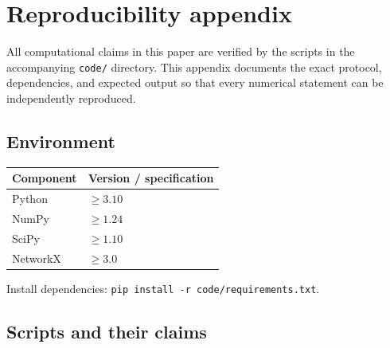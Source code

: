 \documentclass[11pt,a4paper]{amsart}
\theoremstyle{plain}
\theoremstyle{definition}
\theoremstyle{remark}
\begin{document}



\appendix
\section{Reproducibility appendix}\label{app:repro}

All computational claims in this paper are verified by the scripts in the
accompanying \texttt{code/} directory.  This appendix documents the exact
protocol, dependencies, and expected output so that every numerical statement
can be independently reproduced.

\subsection{Environment}

\begin{tabular}{@{}ll@{}}
\toprule
\textbf{Component} & \textbf{Version / specification} \\
\midrule
Python      & $\geq 3.10$ \\
NumPy       & $\geq 1.24$ \\
SciPy       & $\geq 1.10$ \\
NetworkX    & $\geq 3.0$ \\
\bottomrule
\end{tabular}

\medskip\noindent
Install dependencies: \texttt{pip install -r code/requirements.txt}.

\subsection{Scripts and their claims}
\end{document}
